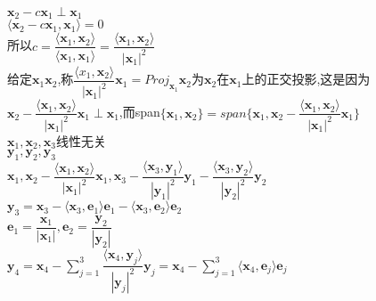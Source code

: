 \documentclass[11pt, a4paper, UTF8]{ctexart}
\begin{document}
$\bm x_2-c\bm x_1\perp\bm x_1$\\
$\langle\bm x_2-c\bm x_1,\bm x_1\rangle=0$\\
所以$c=\dfrac{\langle\bm x_1,\bm x_2\rangle}{\langle\bm x_1,\bm x_1\rangle}=\dfrac{\langle\bm x_1,\bm x_2\rangle}{|\bm x_1|^2}$\\
给定$\bm x_1\bm x_2$,称$\dfrac{\langle x_1,\bm x_2\rangle}{|\bm x_1|^2}\bm x_1=Proj_{\bm x_1}\bm x_2$为$\bm x_2$在$\bm x_1$上的正交投影,这是因为\\
$\bm x_2-\dfrac{\langle\bm x_1,\bm x_2\rangle}{|\bm x_1|^2}\bm x_1\perp\bm x_1$,而span$\{\bm x_1,\bm x_2\}=span\{\bm x_1,\bm x_2-\dfrac{\langle\bm x_1,\bm x_2\rangle}{|\bm x_1|^2}\bm x_1\}$\\
$\bm x_1,\bm x_2,\bm x_3$线性无关\\
$\bm y_1,\bm y_2,\bm y_3$\\
$\bm x_1,\bm x_2-\dfrac{\langle\bm x_1,\bm x_2\rangle}{|\bm x_1|^2}\bm x_1,\bm x_3-\dfrac{\langle\bm x_3,\bm y_1\rangle}{|\bm y_1|^2}\bm y_1-\dfrac{\langle\bm x_3,\bm y_2\rangle}{|\bm y_2|^2}\bm y_2$\\
$\bm y_3=\bm x_3-\langle\bm x_3,\bm e_1\rangle\bm e_1-\langle\bm x_3,\bm e_2\rangle\bm e_2$\\
$\bm e_1=\dfrac{\bm x_1}{|\bm x_1|},\bm e_2=\dfrac{\bm y_2}{|\bm y_2|}$\\
$\bm y_4=\bm x_4-\sum_{j=1}^3\dfrac{\langle\bm x_4,\bm y_j\rangle}{|\bm y_j|^2}\bm y_j=\bm x_4-\sum_{j=1}^3\langle\bm x_4,\bm e_j\rangle\bm e_j$\\
\end{document}
